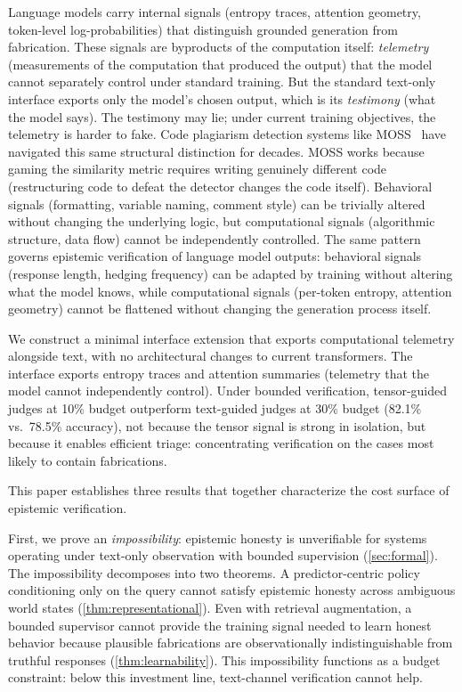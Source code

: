 Language models carry internal signals (entropy traces, attention geometry,
token-level log-probabilities) that distinguish grounded generation from
fabrication. These signals are byproducts of the computation itself:
\emph{telemetry} (measurements of the computation that produced the output)
that the model cannot separately control under standard training. But the
standard text-only interface exports only the model's chosen output, which is its
\emph{testimony} (what the model says). The testimony may lie; under current
training objectives, the telemetry is harder to fake.
Code plagiarism detection systems like
MOSS~\cite{schleimer2003winnowing, mason2019collaboration} have navigated this
same structural distinction for decades. MOSS works because gaming the
similarity metric requires writing genuinely different code (restructuring
code to defeat the detector changes the code itself). Behavioral signals
(formatting, variable naming, comment style) can be trivially altered without
changing the underlying logic, but computational signals (algorithmic structure,
data flow) cannot be independently controlled. The same pattern governs
epistemic verification of language model outputs: behavioral signals (response
length, hedging frequency) can be adapted by training without altering what the
model knows, while computational signals (per-token entropy, attention
geometry) cannot be flattened without changing the generation process itself.

We construct a minimal interface extension that exports computational
telemetry alongside text, with no architectural changes to current
transformers. The interface exports entropy traces and attention
summaries (telemetry that the model cannot independently control). Under
bounded verification, tensor-guided judges at 10\% budget outperform
text-guided judges at 30\% budget (82.1\% vs.\ 78.5\% accuracy), not because
the tensor signal is strong in isolation, but because it enables efficient
triage: concentrating verification on the cases most likely to contain
fabrications.

This paper establishes three results that together characterize the cost
surface of epistemic verification.

First, we prove an \emph{impossibility}: epistemic honesty is unverifiable for
systems operating under text-only observation with bounded supervision
(\autoref{sec:formal}). The impossibility decomposes into two theorems. A
predictor-centric policy conditioning only on the query cannot satisfy
epistemic honesty across ambiguous world states
(\autoref{thm:representational}). Even with retrieval augmentation, a bounded
supervisor cannot provide the training signal needed to learn honest behavior
because plausible fabrications are observationally indistinguishable from
truthful responses (\autoref{thm:learnability}). This impossibility functions
as a budget constraint: below this investment line, text-channel verification
cannot help.

